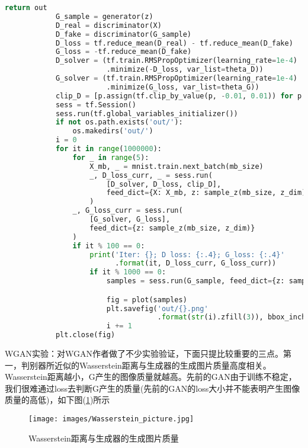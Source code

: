 \begin{lstlisting}[language = Python]
                return out
            G_sample = generator(z)
            D_real = discriminator(X)
            D_fake = discriminator(G_sample)
            D_loss = tf.reduce_mean(D_real) - tf.reduce_mean(D_fake)
            G_loss = -tf.reduce_mean(D_fake)
            D_solver = (tf.train.RMSPropOptimizer(learning_rate=1e-4)
                        .minimize(-D_loss, var_list=theta_D))
            G_solver = (tf.train.RMSPropOptimizer(learning_rate=1e-4)
                        .minimize(G_loss, var_list=theta_G))
            clip_D = [p.assign(tf.clip_by_value(p, -0.01, 0.01)) for p in theta_D]
            sess = tf.Session()
            sess.run(tf.global_variables_initializer())
            if not os.path.exists('out/'):
                os.makedirs('out/')
            i = 0
            for it in range(1000000):
                for _ in range(5):
                    X_mb, _ = mnist.train.next_batch(mb_size)
                    _, D_loss_curr, _ = sess.run(
                        [D_solver, D_loss, clip_D],
                        feed_dict={X: X_mb, z: sample_z(mb_size, z_dim)}
                    )
                _, G_loss_curr = sess.run(
                    [G_solver, G_loss],
                    feed_dict={z: sample_z(mb_size, z_dim)}
                )
                if it % 100 == 0:
                    print('Iter: {}; D loss: {:.4}; G_loss: {:.4}'
                          .format(it, D_loss_curr, G_loss_curr))
                    if it % 1000 == 0:
                        samples = sess.run(G_sample, feed_dict={z: sample_z(16, z_dim)})

                        fig = plot(samples)
                        plt.savefig('out/{}.png'
                                    .format(str(i).zfill(3)), bbox_inches='tight')
                        i += 1
            plt.close(fig)
            \end{lstlisting}
            \par
            WGAN实验：对WGAN作者做了不少实验验证，下面只提比较重要的三点。第一，判别器所近似的Wasserstein距离与生成器的生成图片质量高度相关。Wasserstein距离越小，G产生的图像质量就越高。先前的GAN由于训练不稳定，我们很难通过loss去判断G产生的质量(先前的GAN的loss大小并不能表明产生图像质量的高低)，如下图(\ref{fig:Wasserstein距离与生成器的生成图片质量})所示
                \begin{figure}[H]
                \centering
                \texttt{[image: images/Wasserstein\_picture.jpg]}
                \caption{Wasserstein距离与生成器的生成图片质量}
                \label{fig:Wasserstein距离与生成器的生成图片质量}
                \end{figure}
